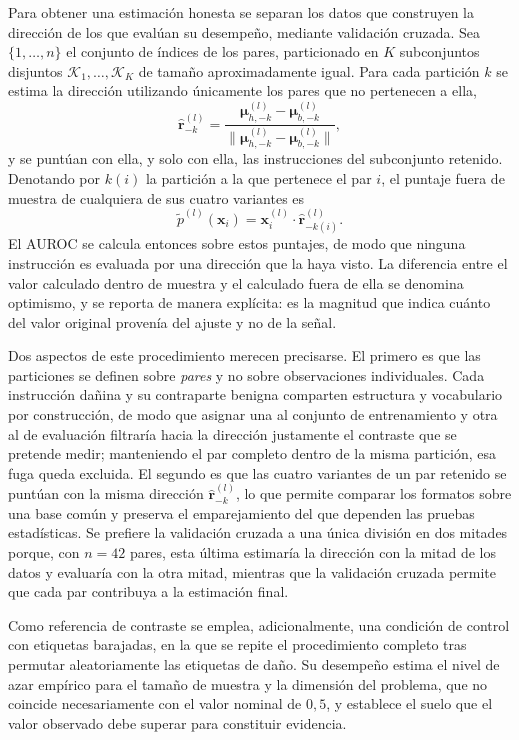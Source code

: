 \documentclass[12pt,a4paper]{article}
\begin{document}
Para obtener una estimación honesta se separan los datos que construyen la dirección de los que evalúan su desempeño, mediante validación cruzada. Sea $\{1, \dots, n\}$ el conjunto de índices de los pares, particionado en $K$ subconjuntos disjuntos $\mathcal{K}_1, \dots, \mathcal{K}_K$ de tamaño aproximadamente igual. Para cada partición $k$ se estima la dirección utilizando únicamente los pares que no pertenecen a ella,
\[
\hat{\bm{r}}^{(l)}_{-k} = \frac{\bm{\mu}_{h,-k}^{(l)} - \bm{\mu}_{b,-k}^{(l)}}{\lVert \bm{\mu}_{h,-k}^{(l)} - \bm{\mu}_{b,-k}^{(l)} \rVert},
\]
y se puntúan con ella, y solo con ella, las instrucciones del subconjunto retenido. Denotando por $k(i)$ la partición a la que pertenece el par $i$, el puntaje fuera de muestra de cualquiera de sus cuatro variantes es
\[
\tilde{p}^{(l)}(\bm{x}_i) = \bm{x}_i^{(l)} \cdot \hat{\bm{r}}^{(l)}_{-k(i)} .
\]
El AUROC se calcula entonces sobre estos puntajes, de modo que ninguna instrucción es evaluada por una dirección que la haya visto. La diferencia entre el valor calculado dentro de muestra y el calculado fuera de ella se denomina optimismo, y se reporta de manera explícita: es la magnitud que indica cuánto del valor original provenía del ajuste y no de la señal.

Dos aspectos de este procedimiento merecen precisarse. El primero es que las particiones se definen sobre \textit{pares} y no sobre observaciones individuales. Cada instrucción dañina y su contraparte benigna comparten estructura y vocabulario por construcción, de modo que asignar una al conjunto de entrenamiento y otra al de evaluación filtraría hacia la dirección justamente el contraste que se pretende medir; manteniendo el par completo dentro de la misma partición, esa fuga queda excluida. El segundo es que las cuatro variantes de un par retenido se puntúan con la misma dirección $\hat{\bm{r}}^{(l)}_{-k}$, lo que permite comparar los formatos sobre una base común y preserva el emparejamiento del que dependen las pruebas estadísticas. Se prefiere la validación cruzada a una única división en dos mitades porque, con $n = 42$ pares, esta última estimaría la dirección con la mitad de los datos y evaluaría con la otra mitad, mientras que la validación cruzada permite que cada par contribuya a la estimación final.

Como referencia de contraste se emplea, adicionalmente, una condición de control con etiquetas barajadas, en la que se repite el procedimiento completo tras permutar aleatoriamente las etiquetas de daño. Su desempeño estima el nivel de azar empírico para el tamaño de muestra y la dimensión del problema, que no coincide necesariamente con el valor nominal de $0{,}5$, y establece el suelo que el valor observado debe superar para constituir evidencia.
\end{document}
